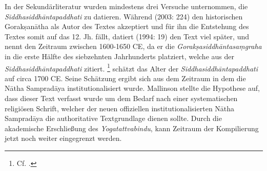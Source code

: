 In der Sekundärliteratur wurden mindestens drei Versuche unternommen, die \emph{Siddhasiddhāntapaddhati} zu datieren. Während \citeauthor{white2003} (2003: 224) den historischen Gorakṣanātha als Autor des Textes akzeptiert und für ihn die Entstehung des Textes somit auf das 12. Jh. fällt, datiert \citeauthor{bouy1994} (1994: 19) den Text viel später, und nennt den Zeitraum zwischen 1600-1650 CE, da er die \emph{Gorakṣasiddhāntasaṃgraha}\nocite{goraksasiddhantasamgraha1973} in die erste Hälfte des siebzehnten Jahrhunderts platziert, welche aus der \emph{Siddhasiddhāntapaddhati} zitiert. \citeauthor{mallinsononline2013}\footnote{Cf. .} schätzt das Alter der \textit{Siddhasiddhāntapaddhati} auf circa 1700 CE. Seine Schätzung ergibt sich aus dem Zeitraum in dem die Nātha Sampradāya institutionalisiert wurde. Mallinson stellte die Hypothese auf, dass dieser Text verfasst wurde um dem Bedarf nach einer systematischen religiösen Schrift, welcher der neuen offiziellen institutionalisierten Nātha Sampradāya die authoritative Textgrundlage dienen sollte. Durch die akademische Erschließung des \textit{Yogatattvabindu}, kann Zeitraum der Kompilierung jetzt noch weiter eingegrenzt werden. 

